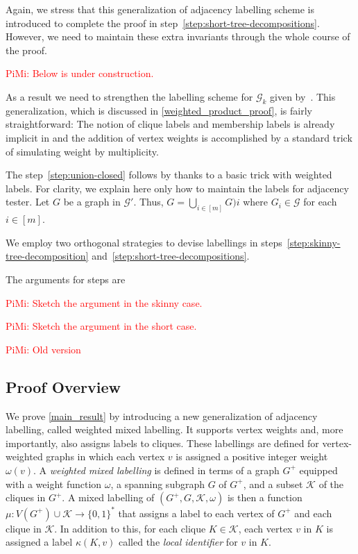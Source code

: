 \documentclass{patmorin}
\newcommand{\piotr}[1]{\noindent\textcolor{red}{PiMi: #1}}
\newcommand{\defin}[1]{\emph{\textcolor{brightmaroon}{#1}}}
\begin{document}
Again, we stress that this generalization of adjacency labelling scheme is introduced to complete the proof in step~\ref{step:short-tree-decompositions}.
However, we need to maintain these extra invariants through the whole course of the proof.

\piotr{Below is under construction.}

As a result we need to strengthen the labelling scheme for $\mathcal{G}_k$ given by~\citet{dujmovic.esperet.ea:adjacency}.
This generalization, which is discussed in \cref{weighted_product_proof}, is fairly straightforward: The notion of clique labels and membership labels is already implicit in \cite{dujmovic.esperet.ea:adjacency} and the addition of vertex weights is accomplished by a  standard trick of simulating weight by multiplicity.


The step~\ref{step:union-closed} follows by thanks to a basic trick with weighted labels.
For clarity, we explain here only how to maintain the labels for adjacency tester.
Let $G$ be a graph in $\mathcal{G}'$. Thus,
$G=\bigcup_{i\in[m]}G)i$ where $G_i\in\mathcal{G}$ for each $i\in[m]$.




We employ two orthogonal strategies to devise labellings in steps~\ref{step:skinny-tree-decomposition} and~\ref{step:short-tree-decompositions}.


The arguments for steps are


\piotr{Sketch the argument in the skinny case.}

\piotr{Sketch the argument in the short case.}


\piotr{Old version}
\subsection{Proof Overview}
\label{ssec:overview}


We prove \cref{main_result} by introducing a new generalization of adjacency labelling, called weighted mixed labelling. It supports vertex weights and, more importantly, also assigns labels to cliques. These labellings are defined for vertex-weighted graphs in which each vertex $v$ is assigned a positive integer weight $\omega(v)$.  A \defin{weighted mixed labelling} is defined in terms of a graph $G^+$ equipped with a weight function $\omega$, a spanning subgraph $G$ of $G^+$, and a subset $\mathcal{K}$ of the cliques in $G^+$. A mixed labelling of $(G^+,G,\mathcal{K},\omega)$ is then a function $\mu:V(G^+)\cup\mathcal{K}\to\{0,1\}^*$ that assigns a label to each vertex of $G^+$ and each clique in $\mathcal{K}$.  In addition to this, for each clique $K\in\mathcal{K}$, each vertex $v$ in $K$ is assigned a label $\kappa(K,v)$ called the \defin{local identifier} for $v$ in $K$.
\end{document}
